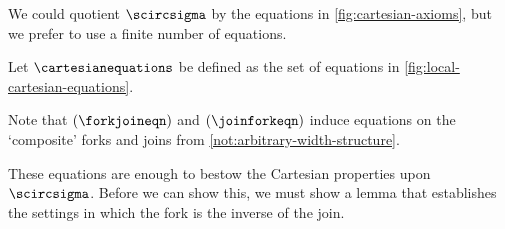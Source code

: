 

We could quotient \(\scircsigma\) by the equations in
\cref{fig:cartesian-axioms}, but we prefer to use a finite number of equations.

\begin{definition}
    Let \(\cartesianequations\) be defined as the set of equations in
    \cref{fig:local-cartesian-equations}.
\end{definition}

\begin{remark}
    Note that \((\forkjoineqn)\) and \((\joinforkeqn)\) induce equations on the
    `composite' forks and joins from \cref{not:arbitrary-width-structure}.
\end{remark}



These equations are enough to bestow the Cartesian properties upon
\(\scircsigma\).
Before we can show this, we must show a lemma that establishes the settings
in which the fork is the inverse of the join.

